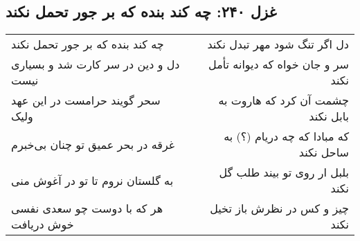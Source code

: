\begin{center}
\section*{غزل ۲۴۰: چه کند بنده که بر جور تحمل نکند}
\label{sec:240}
\begin{longtable}{l p{0.5cm} r}
چه کند بنده که بر جور تحمل نکند
&&
دل اگر تنگ شود مهر تبدل نکند
\\
دل و دین در سر کارت شد و بسیاری نیست
&&
سر و جان خواه که دیوانه تأمل نکند
\\
سحر گویند حرامست در این عهد ولیک
&&
چشمت آن کرد که هاروت به بابل نکند
\\
غرقه در بحر عمیق تو چنان بی‌خبرم
&&
که مبادا که چه دریام (؟) به ساحل نکند
\\
به گلستان نروم تا تو در آغوش منی
&&
بلبل ار روی تو بیند طلب گل نکند
\\
هر که با دوست چو سعدی نفسی خوش دریافت
&&
چیز و کس در نظرش باز تخیل نکند
\\
\end{longtable}
\end{center}
